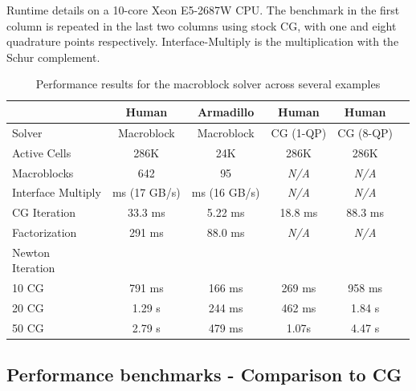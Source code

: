 \renewcommand{\arraystretch}{1.2}
\setlength{\tabcolsep}{3pt}
\begin{table}[b!]
\centering
\vspace*{-.1in}\caption{Performance results for the macroblock solver
  across several examples}{Runtime details on a 10-core Xeon E5-2687W CPU. The benchmark in the first column is repeated in the last two columns using stock CG, with one and eight quadrature points respectively. \textsf{Interface-Multiply} is the multiplication with the Schur complement.}
\label{tbl:performance_results}
\begin{tabular}{ p{4cm} | ccccc}
    \hline
                        & Human   & Armadillo & Human   & Human   &  \\
    \hline
Solver                      & \parbox[t]{3cm}{\centering Macroblock} & \parbox[t]{3cm}{\centering Macroblock} & \parbox[t]{2.5cm}{\centering CG (1-QP)} & \parbox[t]{2.5cm}{\centering CG (8-QP)}& \\
Active Cells                & 286K & 24K    & 286K  & 286K  &  \\
Macroblocks                 & 642     & 95        & \textit{N/A}      & \textit{N/A}      &  \\
\parbox[t]{4cm}{Interface Multiply}          & \parbox[t]{3.5cm}{ ms (17 GB/s)} & \parbox[t]{3.5cm}{ ms (16 GB/s) }  & \textit{N/A} & \textit{N/A}      &  \\
CG Iteration                & 33.3 ms & 5.22 ms   & 18.8 ms & 88.3 ms &  \\
Factorization               & 291 ms  & 88.0 ms   & \textit{N/A} & \textit{N/A}      &  \\
\parbox[t]{2.5cm}{Newton \\ Iteration} &   &     &   &   &  \\
\parbox[t]{2.5cm}{\hspace{.3cm} 10 CG} & 791 ms  & 166 ms    & 269 ms  & 958 ms  &  \\
\parbox[t]{2.5cm}{\hspace{.3cm} 20 CG} & 1.29 s  & 244 ms    & 462 ms & 1.84 s  &  \\
\parbox[t]{2.5cm}{\hspace{.3cm} 50 CG\\ } & 2.79 s  & 479 ms    & 1.07s  & 4.47 s  &  \\
\hline
\end{tabular}
\end{table}

\subsection{Performance benchmarks - Comparison to CG}
\label{sec:macroblocks:cgcompare}

